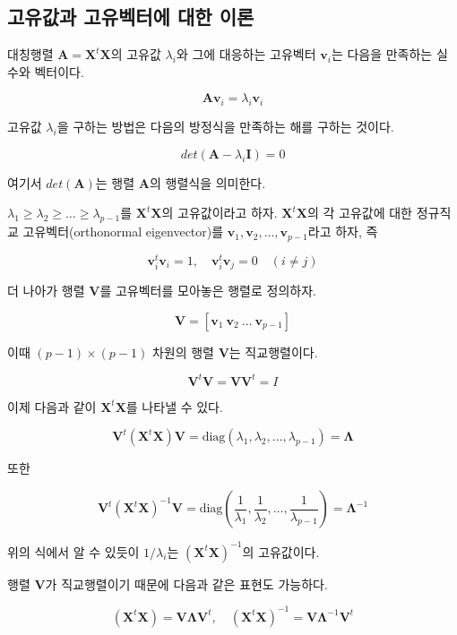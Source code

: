 \documentclass[
]{book}
\begin{document}
\hypertarget{uxace0uxc720uxac12uxacfc-uxace0uxc720uxbca1uxd130uxc5d0-uxb300uxd55c-uxc774uxb860}{%
\subsection{고유값과 고유벡터에 대한 이론}\label{uxace0uxc720uxac12uxacfc-uxace0uxc720uxbca1uxd130uxc5d0-uxb300uxd55c-uxc774uxb860}}

대칭행렬 \(\bm A = \bm X^t\bm X\)의 고유값 \(\lambda_i\)와 그에 대응하는 고유벡터
\(\bm v_i\)는 다음을 만족하는 실수와 벡터이다.

\[ \bm A \bm  v_i = \lambda_i \bm  v_i \]

고유값 \(\lambda_i\)을 구하는 방법은 다음의 방정식을 만족하는 해를 구하는 것이다.

\[ det \left ( \bm A - \lambda_i \bm I \right ) = 0\]

여기서 \(det(\bm A)\)는 행렬 \(\bm A\)의 행렬식을 의미한다.

\(\lambda_1 \ge \lambda_2 \ge \dots \ge \lambda_{p-1}\)를 \(\bm X^t \bm X\)의 고유값이라고 하자. \(\bm X^t \bm X\)의 각 고유값에 대한 정규직교 고유벡터(orthonormal eigenvector)를 \(\bm v_1, \bm v_2,\dots,\bm v_{p-1}\)라고 하자, 즉

\[ \bm  v_i^t \bm  v_i = 1 , \quad \bm  v_i^t \bm  v_j = 0 \quad (i \ne j) \]

더 나아가 행렬 \(\bm V\)를 고유벡터를 모아놓은 행렬로 정의하자.

\[ \bm V=[\bm v_1 ~ \bm v_2 ~\dots ~ \bm v_{p-1} ] \]

이때 \((p-1) \times (p-1)\) 차원의 행렬 \(\bm V\)는 직교행렬이다.

\[ \bm V^t \bm V =\bm V  \bm V^t =I \]

이제 다음과 같이 \(\bm X^t \bm X\)를 나타낼 수 있다.

\[ \bm V^t (\bm X^t \bm X) \bm V = \text{diag}(\lambda_1 , \lambda_2 , \dots , \lambda_{p-1}) = \bm \Lambda \]

또한

\[ \bm V^t (\bm X^t \bm X)^{-1} \bm V = \text{diag} \left (\frac{1}{\lambda_1} , \frac{1}{\lambda_2} , \dots , \frac{1}{\lambda_{p-1}} \right ) = \bm \Lambda^{-1} \]

위의 식에서 알 수 있듯이 \(1/\lambda_i\)는 \((\bm X^t \bm X)^{-1}\)의 고유값이다.

행렬 \(\bm V\)가 직교행렬이기 때문에 다음과 같은 표현도 가능하다.

\[ (\bm X^t \bm X) =  \bm V \bm \Lambda \bm V^t, 
\quad (\bm X^t \bm X)^{-1} =  \bm V \bm \Lambda^{-1} \bm V^t  \]
\end{document}
